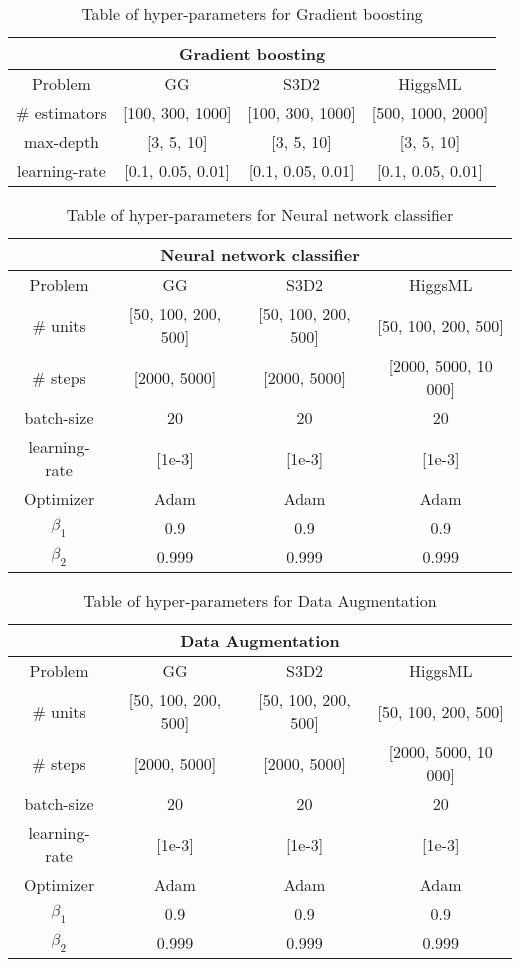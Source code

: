 

\begin{table}[ht!]
\centering
\begin{tabular}{||c c c c||} 
 \hline
 \multicolumn{4}{|c|}{Gradient boosting}\\
 \hline
 Problem & GG & S3D2 & HiggsML \\ [0.5ex] 
 \hline
 \# estimators & [100, 300, 1000] & [100, 300, 1000] & [500, 1000, 2000] \\ 
 max-depth     & [3, 5, 10] & [3, 5, 10] & [3, 5, 10] \\
 learning-rate & [0.1, 0.05, 0.01] & [0.1, 0.05, 0.01] & [0.1, 0.05, 0.01] \\
 \hline
\end{tabular}
\caption{Table of hyper-parameters for Gradient boosting}
\label{table:HP_GB}
\end{table}


\begin{table}[ht!]
\centering
\begin{tabular}{||c c c c||} 
 \hline
 \multicolumn{4}{|c|}{Neural network classifier}\\
 \hline
 Problem & GG & S3D2 & HiggsML \\ [0.5ex] 
 \hline
 \# units & [50, 100, 200, 500] & [50, 100, 200, 500] & [50, 100, 200, 500] \\ 
 \# steps & [2000, 5000] & [2000, 5000] & [2000, 5000, 10 000] \\
 batch-size &  20 &  20 & 20 \\
 learning-rate & [1e-3] & [1e-3] & [1e-3] \\
 Optimizer & Adam & Adam & Adam \\
 $\beta_1$ & 0.9 & 0.9 & 0.9 \\
 $\beta_2$ & 0.999 & 0.999 & 0.999 \\
 \hline
\end{tabular}
\caption{Table of hyper-parameters for Neural network classifier}
\label{table:HP_NN}
\end{table}


\begin{table}[ht!]
\centering
\begin{tabular}{||c c c c||} 
 \hline
 \multicolumn{4}{|c|}{Data Augmentation}\\
 \hline
 Problem & GG & S3D2 & HiggsML \\ [0.5ex] 
 \hline
 \# units & [50, 100, 200, 500] & [50, 100, 200, 500] & [50, 100, 200, 500] \\ 
 \# steps & [2000, 5000] & [2000, 5000] & [2000, 5000, 10 000] \\
 batch-size &  20 &  20 & 20 \\
 learning-rate & [1e-3] & [1e-3] & [1e-3] \\
 Optimizer & Adam & Adam & Adam \\
 $\beta_1$ & 0.9 & 0.9 & 0.9 \\
 $\beta_2$ & 0.999 & 0.999 & 0.999 \\
 \hline
\end{tabular}
\caption{Table of hyper-parameters for Data Augmentation}
\label{table:HP_DA}
\end{table}


